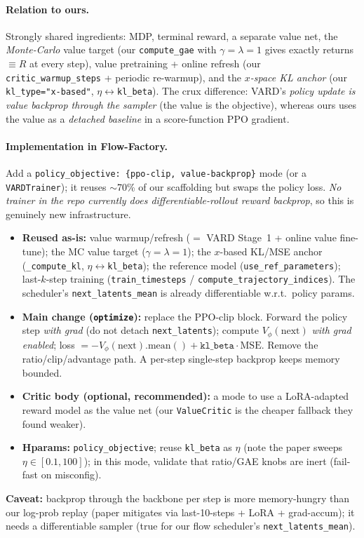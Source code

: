 \documentclass[11pt]{article}
\theoremstyle{remark}
\newcommand{\Vphi}{V_\phi}
\begin{document}
\paragraph{Relation to ours.}
Strongly shared ingredients: MDP, terminal reward, a separate value net, the
\emph{Monte-Carlo} value target (our \texttt{compute\_gae} with $\gamma=\lambda=1$ gives
exactly returns $\equiv R$ at every step), value pretraining + online refresh (our
\texttt{critic\_warmup\_steps} + periodic re-warmup), and the \emph{$x$-space KL anchor}
(our \texttt{kl\_type="x-based"}, $\eta\leftrightarrow$\texttt{kl\_beta}). The crux
difference: VARD's \emph{policy update is value backprop through the sampler} (the value
is the objective), whereas ours uses the value as a \emph{detached baseline} in a
score-function PPO gradient.

\paragraph{Implementation in Flow-Factory.}
Add a \texttt{policy\_objective: \{ppo-clip, value-backprop\}} mode (or a
\texttt{VARDTrainer}); it reuses $\sim$70\% of our scaffolding but swaps the policy loss.
\emph{No trainer in the repo currently does differentiable-rollout reward backprop}, so
this is genuinely new infrastructure.
\begin{itemize}[leftmargin=1.6em]
  \item \textbf{Reused as-is:} value warmup/refresh ($=$ VARD Stage~1 + online value
  fine-tune); the MC value target ($\gamma{=}\lambda{=}1$); the $x$-based KL/MSE anchor
  (\texttt{\_compute\_kl}, $\eta\leftrightarrow$\texttt{kl\_beta}); the reference model
  (\texttt{use\_ref\_parameters}); last-$k$-step training (\texttt{train\_timesteps} /
  \texttt{compute\_trajectory\_indices}). The scheduler's
  \texttt{next\_latents\_mean} is already differentiable w.r.t.\ policy params.
  \item \textbf{Main change (\texttt{optimize}):} replace the PPO-clip block. Forward the
  policy step \emph{with grad} (do not detach \texttt{next\_latents}); compute
  $\Vphi(\text{next})$ \emph{with grad enabled}; loss
  $=-\Vphi(\text{next}).\mathrm{mean}()+\texttt{kl\_beta}\cdot\mathrm{MSE}$. Remove the
  ratio/clip/advantage path. A per-step single-step backprop keeps memory bounded.
  \item \textbf{Critic body (optional, recommended):} a mode to use a LoRA-adapted
  reward model as the value net (our \texttt{ValueCritic} is the cheaper fallback they
  found weaker).
  \item \textbf{Hparams:} \texttt{policy\_objective}; reuse \texttt{kl\_beta} as $\eta$
  (note the paper sweeps $\eta\in[0.1,100]$); in this mode, validate that ratio/GAE
  knobs are inert (fail-fast on misconfig).
\end{itemize}
\textbf{Caveat:} backprop through the backbone per step is more memory-hungry than our
log-prob replay (paper mitigates via last-10-steps + LoRA + grad-accum); it needs a
differentiable sampler (true for our flow scheduler's \texttt{next\_latents\_mean}).
\end{document}

